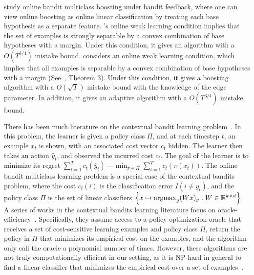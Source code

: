 \cite{Chen-Lin-Lu-2014, Zhang-Jung-Tewari-2018} study online bandit multiclass
boosting under bandit feedback, where one can view online boosting as online
linear classification by treating each base hypothesis as a separate feature.
\cite{Chen-Lin-Lu-2014}'s online weak learning condition implies that
the set of examples is strongly separable by a convex combination of base hypotheses
with a margin. Under this condition, it gives an algorithm with a $O(T^{3/4})$
mistake bound. \cite{Zhang-Jung-Tewari-2018} considers an online weak learning
condition, which implies that all examples is separable by a convex combination of base hypotheses with a margin (See~\cite{Mukherjee-Schapire-2013}, Theorem 3).
Under this condition, it gives
a boosting algorithm with a $O(\sqrt{T})$ mistake bound with the knowledge of the edge
parameter. In addition, it gives an adaptive algorithm with a $O(T^{3/4})$
mistake bound.


There has been much literature on the contextual bandit learning problem~\citep{Auer-2003, Langford-Zhang-2007}.
In this problem, the learner is given a policy class $\Pi$, and
at each timestep $t$, an example $x_t$ is shown, with an associated cost vector $c_t$ hidden.
The learner then takes an action $\hat{y}_t$, and observed the incurred cost $c_t$.
The goal of the learner is to minimize its regret $\sum_{t=1}^T c_t(\hat{y}_t) - \min_{\pi \in \Pi} \sum_{t=1}^T c_t(\pi(x_t))$.
The online bandit multiclass learning problem is a special case of the contextual bandits problem,
where the cost $c_t(i)$ is the classification error $I(i \neq y_t)$,
and the policy class $\Pi$ is the set of linear classifiers
$\cbr{x \mapsto \argmax_y (Wx)_y: W \in \R^{k \times d}}$.
A series of works in the contextual bandits learning literature focus on
oracle-efficiency~\citep{DudikHKKLRZ11, Monster:2014, RakhlinS16, Syrgkanis2016a, Syrgkanis2016b}.
Specifically, they assume access to a policy optimization
oracle that receives a set of cost-sensitive learning examples and policy class $\Pi$,
return the policy in $\Pi$ that minimizes its empirical cost on the examples, and the algorithm
only call the oracle a polynomial number of times.
However, these algorithms are not truly computationally efficient in our setting,
as it is NP-hard in general to find a linear classifier that minimizes the empirical cost over a set of examples~\citep{arora1997hardness}.




